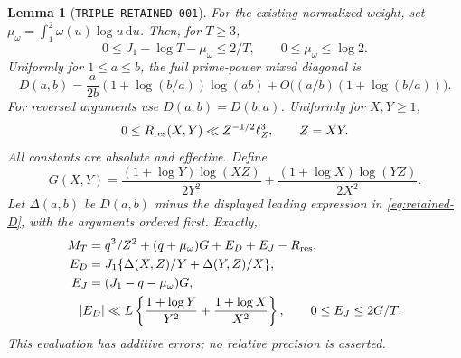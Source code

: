 \documentclass[11pt]{article}
\newtheorem{lemma}{Lemma}
\newcommand{\dd}{\,\mathrm d}
\begin{document}
\begin{lemma}[\texttt{TRIPLE-RETAINED-001}]\label{lem:triple-retained}
For the existing normalized weight, set
\(\mu_\omega=\int_1^2\omega(u)\log u\dd u\). Then, for \(T\geq3\),
\begin{equation}\label{eq:retained-J}
 0\leq J_1-\log T-\mu_\omega\leq2/T,\qquad
 0\leq\mu_\omega\leq\log2.
\end{equation}
Uniformly for \(1\leq a\leq b\), the full prime-power mixed diagonal is
\begin{equation}\label{eq:retained-D}
 D(a,b)=\frac{a}{2b}(1+\log(b/a))\log(ab)
              +O\bigl((a/b)(1+\log(b/a))\bigr).
\end{equation}
For reversed arguments use \(D(a,b)=D(b,a)\). Uniformly for \(X,Y\geq1\),
\begin{equation}\label{eq:retained-resonance}
 0\leq R_{\rm res}(X,Y)\ll Z^{-1/2}\ell_Z^3,\qquad Z=XY.
\end{equation}
All constants are absolute and effective. Define
\begin{equation}\label{eq:retained-G}
 G(X,Y)=\frac{(1+\log Y)\log(XZ)}{2Y^2}
                  +\frac{(1+\log X)\log(YZ)}{2X^2}.
\end{equation}
Let \(\Delta(a,b)\) be \(D(a,b)\) minus the displayed leading expression
in \eqref{eq:retained-D}, with the arguments ordered first. Exactly,
\begin{align}
 M_T={}&q^3/Z^2+(q+\mu_\omega)G+E_D+E_J-R_{\rm res},\notag\\
 E_D={}&J_1\{\Delta(X,Z)/Y+\Delta(Y,Z)/X\},\notag\\
 E_J={}&(J_1-q-\mu_\omega)G,\label{eq:retained-evaluation}\\
 |E_D|&\ll L\left\{\frac{1+\log Y}{Y^2}+
                          \frac{1+\log X}{X^2}\right\},\qquad
 0\leq E_J\leq2G/T.\notag
\end{align}
This evaluation has additive errors; no relative precision is asserted.
\end{lemma}
\end{document}
